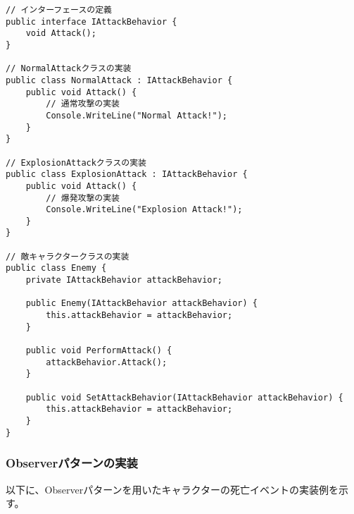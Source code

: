 \documentclass[dvipdfmx,fleqn,article]{jlreq}
\begin{document}
\begin{lstlisting}[language=CSharp, caption=Strategyパターンの実装例]
// インターフェースの定義
public interface IAttackBehavior {
    void Attack();
}

// NormalAttackクラスの実装
public class NormalAttack : IAttackBehavior {
    public void Attack() {
        // 通常攻撃の実装
        Console.WriteLine("Normal Attack!");
    }
}

// ExplosionAttackクラスの実装
public class ExplosionAttack : IAttackBehavior {
    public void Attack() {
        // 爆発攻撃の実装
        Console.WriteLine("Explosion Attack!");
    }
}

// 敵キャラクタークラスの実装
public class Enemy {
    private IAttackBehavior attackBehavior;

    public Enemy(IAttackBehavior attackBehavior) {
        this.attackBehavior = attackBehavior;
    }

    public void PerformAttack() {
        attackBehavior.Attack();
    }

    public void SetAttackBehavior(IAttackBehavior attackBehavior) {
        this.attackBehavior = attackBehavior;
    }
}
\end{lstlisting}

\subsubsection{Observerパターンの実装}
以下に、Observerパターンを用いたキャラクターの死亡イベントの実装例を示す。
\end{document}
